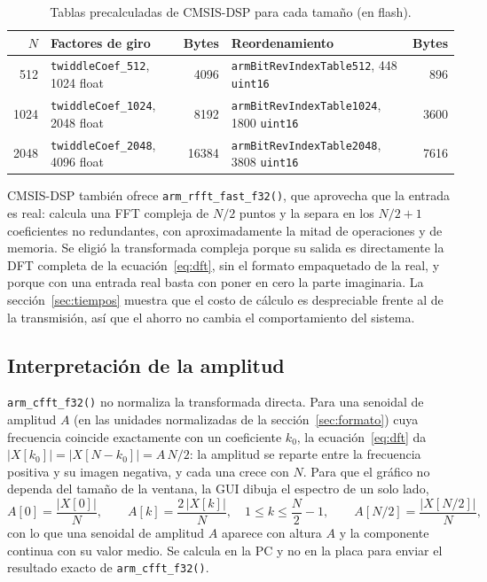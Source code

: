 \documentclass[11pt,a4paper]{article}
\begin{document}
\begin{table}[H]
\centering
\caption{Tablas precalculadas de CMSIS-DSP para cada tamaño (en flash).}
\label{tab:tablas}
\small
\begin{tabular}{@{}r l r l r@{}}
\toprule
\textbf{$N$} & \textbf{Factores de giro} & \textbf{Bytes} &
\textbf{Reordenamiento} & \textbf{Bytes}\\
\midrule
512  & \texttt{twiddleCoef\_512}, \num{1024} float  & \num{4096}  &
       \texttt{armBitRevIndexTable512}, 448 \texttt{uint16}   & 896\\
1024 & \texttt{twiddleCoef\_1024}, \num{2048} float & \num{8192}  &
       \texttt{armBitRevIndexTable1024}, \num{1800} \texttt{uint16} & \num{3600}\\
2048 & \texttt{twiddleCoef\_2048}, \num{4096} float & \num{16384} &
       \texttt{armBitRevIndexTable2048}, \num{3808} \texttt{uint16} & \num{7616}\\
\bottomrule
\end{tabular}
\end{table}

CMSIS-DSP también ofrece \texttt{arm\_rfft\_fast\_f32()}, que aprovecha que
la entrada es real: calcula una FFT compleja de $N/2$ puntos y la separa en
los $N/2+1$ coeficientes no redundantes, con aproximadamente la mitad de
operaciones y de memoria. Se eligió la transformada compleja porque su
salida es directamente la DFT completa de la ecuación~\eqref{eq:dft}, sin
el formato empaquetado de la real, y porque con una entrada real basta con
poner en cero la parte imaginaria. La sección~\ref{sec:tiempos} muestra que
el costo de cálculo es despreciable frente al de la transmisión, así que el
ahorro no cambia el comportamiento del sistema.

\subsection{Interpretación de la amplitud}\label{sec:amplitud}

\texttt{arm\_cfft\_f32()} no normaliza la transformada directa. Para una
senoidal de amplitud $A$ (en las unidades normalizadas de la
sección~\ref{sec:formato}) cuya frecuencia coincide exactamente con un
coeficiente $k_0$, la ecuación~\eqref{eq:dft} da $|X[k_0]| = |X[N-k_0]| =
A\,N/2$: la amplitud se reparte entre la frecuencia positiva y su imagen
negativa, y cada una crece con $N$. Para que el gráfico no dependa del
tamaño de la ventana, la GUI dibuja el espectro de un solo lado,
\begin{equation}
  A[0] = \frac{|X[0]|}{N}, \qquad
  A[k] = \frac{2\,|X[k]|}{N}, \quad 1 \le k \le \frac{N}{2} - 1, \qquad
  A[N/2] = \frac{|X[N/2]|}{N},
  \label{eq:amplitud}
\end{equation}
con lo que una senoidal de amplitud $A$ aparece con altura $A$ y la
componente continua con su valor medio. Se calcula en la PC y no en la
placa para enviar el resultado exacto de \texttt{arm\_cfft\_f32()}.
\end{document}

